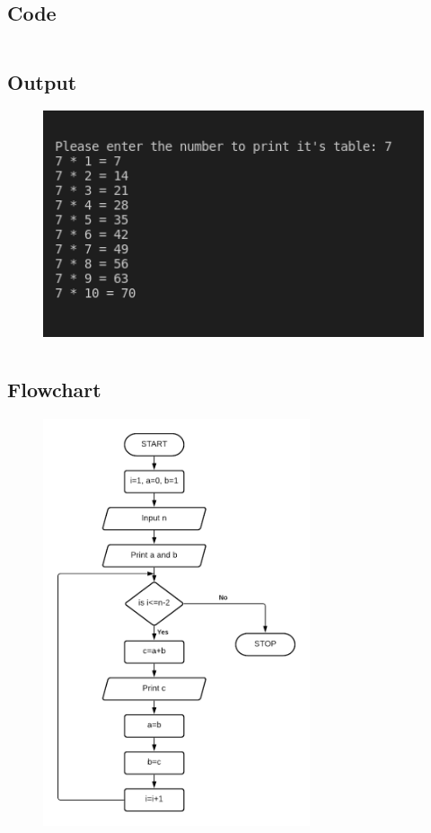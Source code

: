 \documentclass[12pt]{article}
\begin{document}
\subsection{Code}
\inputminted{c}{q2.c}
\subsection{Output}
\begin{figure}[h]
    \centering
    \includegraphics[width=1.0\textwidth]{2.png}
\end{figure}
\newpage
\section{}
\subsection{Flowchart}
\begin{figure}[h]
    \centering
    \includegraphics[width=0.7\textwidth]{Flowchart03.png}
\end{figure}
\newpage
\end{document}
